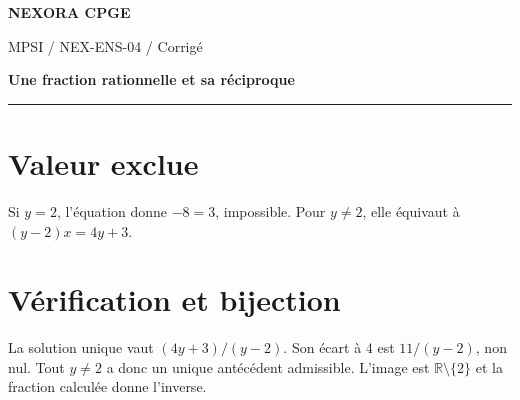 \documentclass[11pt,a4paper]{article}
\begin{document}
{\small\bfseries\color{nexorablue} NEXORA CPGE}\par
{\small MPSI / NEX-ENS-04 / Corrigé}\par
{\LARGE\bfseries Une fraction rationnelle et sa réciproque}\par
\vspace{0.25em}\hrule\vspace{0.6em}

\section*{Valeur exclue}
Si $y=2$, l’équation donne $-8=3$, impossible. Pour $y\ne2$, elle équivaut à $(y-2)x=4y+3$.

\section*{Vérification et bijection}
La solution unique vaut $(4y+3)/(y-2)$. Son écart à $4$ est $11/(y-2)$, non nul. Tout $y\ne2$ a donc un unique antécédent admissible. L’image est $\mathbb R\setminus\{2\}$ et la fraction calculée donne l’inverse.
\end{document}

